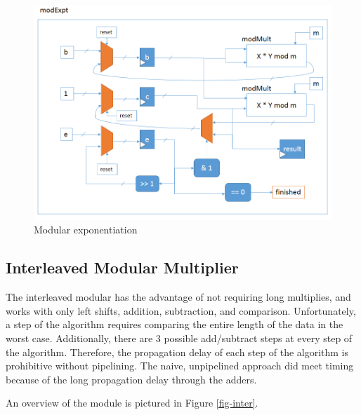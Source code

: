 \documentclass[a4paper,11pt]{report}
\begin{document}
\begin{figure}
  \begin{centering}
    \includegraphics[width=\textwidth]{modexpt.png}
    \caption{Modular exponentiation}
    \label{fig-expt}
  \end{centering}
\end{figure}

\subsection{Interleaved Modular Multiplier}
The interleaved modular has the advantage of not requiring long multiplies, and works with
only left shifts, addition, subtraction, and comparison. Unfortunately, a step of the 
algorithm requires comparing the entire length of the data in the worst case. Additionally,
there are 3 possible add/subtract steps at every step of the algorithm. Therefore, the propagation delay
of each step of the algorithm is prohibitive without pipelining. The naive, unpipelined approach did 
meet timing because of the long propagation delay through the adders.

An overview of the module is pictured in Figure \ref{fig-inter}.
\end{document}
